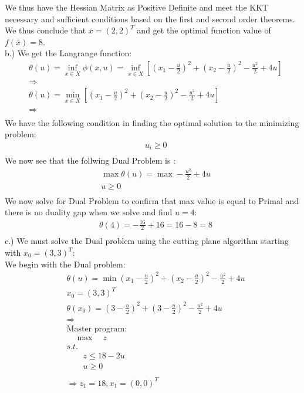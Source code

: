 \documentclass[12pt]{article}
\begin{document}
    We thus have the Hessian Matrix as Positive Definite and meet the KKT necessary and sufficient conditions based on the first and second order theorems. We thus conclude that $\bar x = (2,2)^T $ and get the optimal function value of $f(\bar x) = 8$. \\
    b.) We get the Langrange function: 
    \begin{align*}
        & \theta (u) = \inf_{x \in X} \phi (x,u) = \inf_{x \in X} [(x_1 - \frac{u}{2})^2 + (x_2 - \frac{u}{2})^2 - \frac{u^2}{2} + 4u]\\
        &\Rightarrow\\
        &\theta (u) = \min_{x \in X} [(x_1 - \frac{u}{2})^2 + (x_2 - \frac{u}{2})^2 - \frac{u^2}{2} + 4u]\\
        &\Rightarrow\\
    \end{align*}
    We have the following condition in finding the optimal solution to the minimizing problem:\\
        \begin{align*}
            &u_i \geq 0\\
        \end{align*}
    We now see that the follwing Dual Problem is : \\
        \begin{align*}
            & \max \theta (u) = \max - \frac{u^2}{2} + 4u\\
            &u \geq 0\\
        \end{align*}
    We now solve for Dual Problem to confirm that max value is equal to Primal and there is no duality gap when we solve and find $u = 4$: \\ 
        \begin{align*}
            &\theta(4) = -\frac{16}{2} + 16 = 16 - 8 = 8 \\
        \end{align*}
    c.) We must solve the Dual problem using the cutting plane algorithm starting with $x_0 = (3,3)^T:$\\
    We begin with the Dual problem: 
        \begin{align*}
            &\theta(u) = \min (x_1 - \frac{u}{2})^2 + (x_2 - \frac{u}{2})^2 - \frac{u^2}{2} + 4u \\ 
            &x_0 = (3,3)^T\\
            &\theta(x_0) = (3 - \frac{u}{2})^2 + (3 - \frac{u}{2})^2 - \frac{u^2}{2} + 4u \\ 
            &\Rightarrow\\
            &\text{Master program:}\\
            &\quad \max \quad z \\ 
            &s.t.\\
            &\quad \quad z \leq 18-2u\\
            &\quad \quad u \geq 0\\\\
            &\Rightarrow z_1 = 18 , x_1 = (0,0)^T 
        \end{align*}
\end{document}
